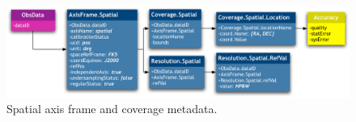 			\begin{figure}[tbp]
			\begin{center}
			\includegraphics[width=\columnwidth]
			{fig/AxisFrame-Spatial-DM}
			\end{center}
			\caption[Spatial axis frame metadata]
			{
				Spatial axis frame and coverage metadata.
			}
			\label{figAxisFrameSpatial}
			\end{figure}

